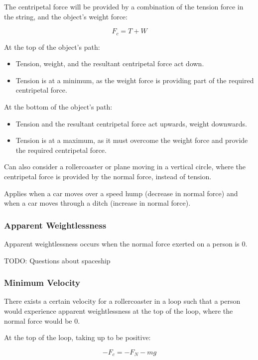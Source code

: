 \documentclass[a4paper,11pt]{report}
\begin{document}
The centripetal force will be provided by a combination of the tension force
in the string, and the object's weight force:

$$
F_c = T + W
$$

At the top of the object's path:

\begin{itemize}
\item Tension, weight, and the resultant centripetal force act down.
\item Tension is at a minimum, as the weight force is providing part of the
	required centripetal force.
\end{itemize}

At the bottom of the object's path:

\begin{itemize}
\item Tension and the resultant centripetal force act upwards, weight downwards.
\item Tension is at a maximum, as it must overcome the weight force and provide
	the required centripetal force.
\end{itemize}

Can also consider a rollercoaster or plane moving in a vertical circle, where
the centripetal force is provided by the normal force, instead of tension.

Applies when a car moves over a speed hump (decrease in normal force) and when
a car moves through a ditch (increase in normal force).

\subsubsection{Apparent Weightlessness}

Apparent weightlessness occurs when the normal force exerted on a person is 0.

TODO: Questions about spaceship

\subsubsection{Minimum Velocity}

There exists a certain velocity for a rollercoaster in a loop such that a
person would experience apparent weightlessness at the top of the loop, where
the normal force would be 0.

At the top of the loop, taking up to be positive:

$$
-F_c = -F_N - mg
$$
\end{document}
